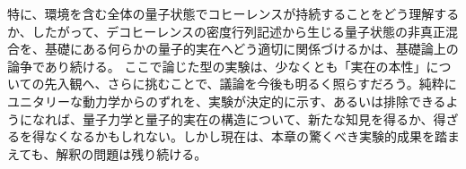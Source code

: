 特に、環境を含む全体の量子状態でコヒーレンスが持続することをどう理解するか、したがって、デコヒーレンスの密度行列記述から生じる量子状態の非真正混合を、基礎にある何らかの量子的実在へどう適切に関係づけるかは、基礎論上の論争であり続ける。
\hypertarget{srcpage:291}{}\label{srcpage:291}
ここで論じた型の実験は、少なくとも「実在の本性」についての先入観へ、さらに挑むことで、議論を今後も明るく照らすだろう。純粋にユニタリーな動力学からのずれを、実験が決定的に示す、あるいは排除できるようになれば、量子力学と量子的実在の構造について、新たな知見を得るか、得ざるを得なくなるかもしれない。しかし現在は、本章の驚くべき実験的成果を踏まえても、解釈の問題は残り続ける。
